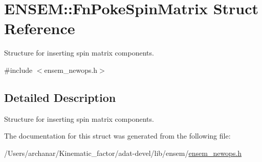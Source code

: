 \hypertarget{structENSEM_1_1FnPokeSpinMatrix}{}\section{E\+N\+S\+EM\+:\+:Fn\+Poke\+Spin\+Matrix Struct Reference}
\label{structENSEM_1_1FnPokeSpinMatrix}


Structure for inserting spin matrix components.  




{\ttfamily \#include $<$ensem\+\_\+newops.\+h$>$}



\subsection{Detailed Description}
Structure for inserting spin matrix components. 

The documentation for this struct was generated from the following file\+:\begin{DoxyCompactItemize}
\item 
/\+Users/archanar/\+Kinematic\+\_\+factor/adat-\/devel/lib/ensem/\mbox{\hyperlink{adat-devel_2lib_2ensem_2ensem__newops_8h}{ensem\+\_\+newops.\+h}}\end{DoxyCompactItemize}
